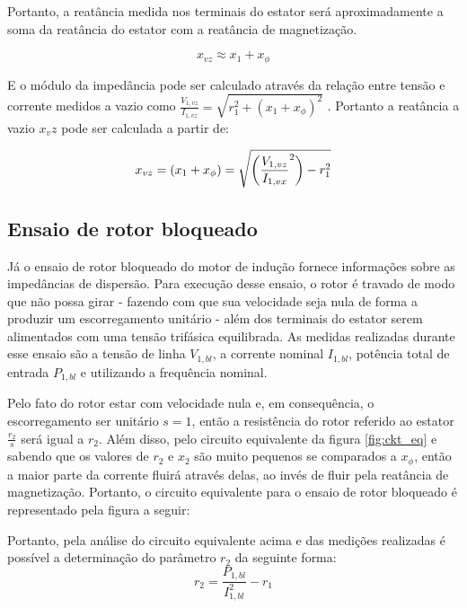 

\par Portanto, a reatância medida nos terminais do estator será aproximadamente a soma da reatância do estator com a reatância de magnetização. 

        $$x_{vz} \approx x_1 + x_{\phi}$$

\par E o módulo da impedância pode ser calculado através da relação entre tensão e corrente medidos a vazio como $\frac{V_{1, vz}}{I_{1, vz}} = \sqrt{r_1^2 + (x_1 + x_{\phi})^2}$ . Portanto a reatância a vazio $x_vz$ pode ser calculada a partir de:

    $$x_{vz} = (x_1 + x_{\phi}) = \sqrt{ \left(\frac {V_{1, vz}} {I_{1, vx}}^2 \right) - r_1^2 }$$
    
\subsection{Ensaio de rotor bloqueado}

\par Já o ensaio de rotor bloqueado do motor de indução fornece informações sobre as impedâncias de dispersão. Para execução desse ensaio, o rotor é travado de modo que não possa girar - fazendo com que sua velocidade seja nula de forma a produzir um escorregamento unitário - além dos terminais do estator serem alimentados com uma tensão trifásica equilibrada. As medidas realizadas durante esse ensaio são a tensão de linha $V_{1,bl}$, a corrente nominal $I_{1,bl}$, potência total de entrada $P_{1,bl}$ e utilizando a frequência nominal.

\par Pelo fato do rotor estar com velocidade nula e, em consequência, o escorregamento ser unitário $s=1$, então a resistência do rotor referido ao estator $\frac{r_2}{s}$ será igual a $r_2$. Além disso, pelo circuito equivalente da figura \ref{fig:ckt_eq} e sabendo que os valores de $r_2$ e $x_2$ são muito pequenos se comparados a $x_{\phi}$, então a maior parte da corrente fluirá através delas, ao invés de fluir pela reatância de magnetização. Portanto, o circuito equivalente para o ensaio de rotor bloqueado é representado pela figura a seguir:



\par Portanto, pela análise do circuito equivalente acima e das medições realizadas é possível a determinação do parâmetro $r_2$ da seguinte forma:
        $$r_2 = \frac{P_{1, bl}}{I_{1,bl}^2} - r_1$$
        
